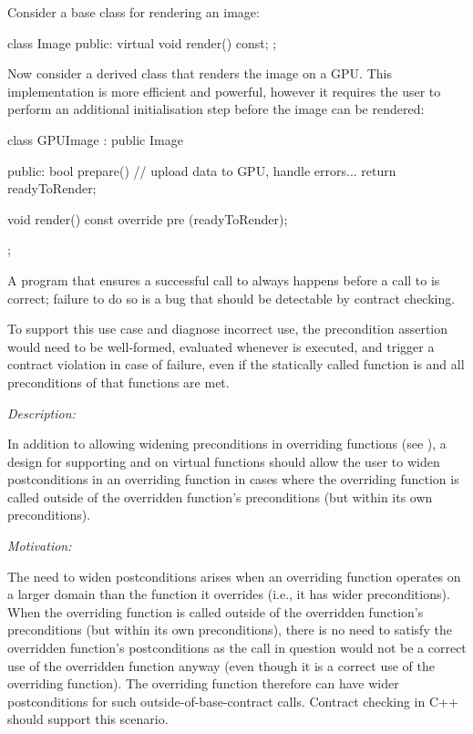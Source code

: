 Consider a base class for rendering an image:

\begin{codeblock}
class Image {
public:
  virtual void render() const;
};
\end{codeblock}

Now consider a derived class that renders the image on a GPU. This implementation is more efficient and powerful, however it requires the user to perform an additional initialisation step before the image can be rendered:

\begin{codeblock}
class GPUImage : public Image {
public:
  bool prepare() { 
    // upload data to GPU, handle errors...
    return readyToRender;
  }
  
  void render() const override
    pre (readyToRender);
};
\end{codeblock}

A program that ensures a successful call to  always happens before a call to  is correct; failure to do so is a bug that should be detectable by contract checking. 

To support this use case and diagnose incorrect use, the precondition assertion \mbox{} would need to be well-formed, evaluated whenever  is executed, and trigger a contract violation in case of failure, even if the statically called function is  and all preconditions of that functions are met.



\emph{Description:}

In addition to allowing widening preconditions in overriding functions (see ), a design for supporting  and  on virtual functions should allow the user to widen postconditions in an overriding function in cases where the overriding function is called outside of the overridden function's preconditions (but within its own preconditions).

\emph{Motivation:}

The need to widen postconditions arises when an overriding function operates on a larger domain than the function it overrides (i.e., it has wider preconditions). When the overriding function is called outside of the overridden function's preconditions (but within its own preconditions), there is no need to satisfy the overridden function's postconditions as the call in question would not be a correct use of the overridden function anyway (even though it is a correct use of the overriding function). The overriding function therefore can have wider postconditions for such outside-of-base-contract calls. Contract checking in C++ should support this scenario.

